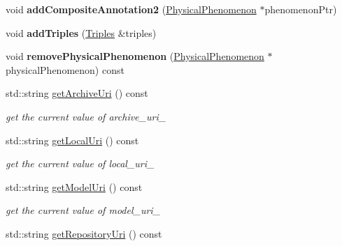 \begin{DoxyCompactItemize}
void {\bfseries add\+Composite\+Annotation2} (\hyperlink{classomexmeta_1_1PhysicalPhenomenon}{Physical\+Phenomenon} $\ast$phenomenon\+Ptr)
\item 
\mbox{\label{classomexmeta_1_1Editor_ace8ee873498fa72b63c0747775b729f5}} 
void {\bfseries add\+Triples} (\hyperlink{classomexmeta_1_1Triples}{Triples} \&triples)
\item 
\mbox{\label{classomexmeta_1_1Editor_af00f00108238acbf2b2974cedc07b454}} 
void {\bfseries remove\+Physical\+Phenomenon} (\hyperlink{classomexmeta_1_1PhysicalPhenomenon}{Physical\+Phenomenon} $\ast$physical\+Phenomenon) const
\item 
\mbox{\label{classomexmeta_1_1Editor_a736e49794c5a358f06d13d41c3657fe2}} 
std\+::string \hyperlink{classomexmeta_1_1Editor_a736e49794c5a358f06d13d41c3657fe2}{get\+Archive\+Uri} () const
\begin{DoxyCompactList}\small\item\em get the current value of archive\+\_\+uri\+\_\+ \end{DoxyCompactList}\item 
\mbox{\label{classomexmeta_1_1Editor_a8494826923de713c19f971fd9c7908c0}} 
std\+::string \hyperlink{classomexmeta_1_1Editor_a8494826923de713c19f971fd9c7908c0}{get\+Local\+Uri} () const
\begin{DoxyCompactList}\small\item\em get the current value of local\+\_\+uri\+\_\+ \end{DoxyCompactList}\item 
\mbox{\label{classomexmeta_1_1Editor_a0020d3b9c3e91fb37c134ba8b211c13e}} 
std\+::string \hyperlink{classomexmeta_1_1Editor_a0020d3b9c3e91fb37c134ba8b211c13e}{get\+Model\+Uri} () const
\begin{DoxyCompactList}\small\item\em get the current value of model\+\_\+uri\+\_\+ \end{DoxyCompactList}\item 
\mbox{\label{classomexmeta_1_1Editor_a2264cbd2efae17d1d72c3f402d8721bf}} 
std\+::string \hyperlink{classomexmeta_1_1Editor_a2264cbd2efae17d1d72c3f402d8721bf}{get\+Repository\+Uri} () const

\end{DoxyCompactItemize}
